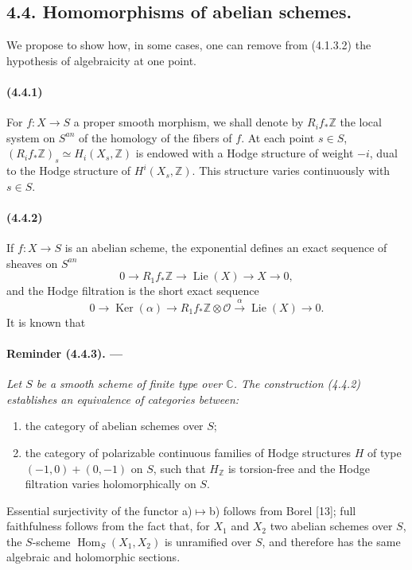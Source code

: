 \documentclass[10pt]{article}
\newcommand{\C}{\mathbb C}
\newcommand{\Z}{\mathbb Z}
\newcommand{\Ker}{\operatorname{Ker}}
\newcommand{\Hom}{\operatorname{Hom}}
\providecommand{\Lie}{\operatorname{Lie}}
\providecommand{\cO}{\mathcal O}
\providecommand{\cO}{\mathcal O}
\begin{document}
\subsection*{4.4. Homomorphisms of abelian schemes.}

We propose to show how, in some cases, one can remove from (4.1.3.2) the hypothesis of algebraicity at one point.

\paragraph{(4.4.1)} For $f:X\to S$ a proper smooth morphism, we shall denote by $R_if_*\Z$ the local system on $S^{an}$ of the homology of the fibers of $f$. At each point $s\in S$, $(R_if_*\Z)_s\simeq H_i(X_s,\Z)$ is endowed with a Hodge structure of weight $-i$, dual to the Hodge structure of $H^i(X_s,\Z)$. This structure varies continuously with $s\in S$.

\paragraph{(4.4.2)} If $f:X\to S$ is an abelian scheme, the exponential defines an exact sequence of sheaves on $S^{an}$
\[
0\to R_1f_*\Z\to\Lie(X)\to X\to0,
\]
and the Hodge filtration is the short exact sequence
\[
0\to\Ker(\alpha)\to R_1f_*\Z\otimes\cO\xrightarrow{\alpha}\Lie(X)\to0.
\]
It is known that

\paragraph{Reminder (4.4.3). ---} {\itshape Let $S$ be a smooth scheme of finite type over $\C$. The construction (4.4.2) establishes an equivalence of categories between:
\begin{enumerate}[label=\alph*)]
\item the category of abelian schemes over $S$;
\item the category of polarizable continuous families of Hodge structures $H$ of type $(-1,0)+(0,-1)$ on $S$, such that $H_\Z$ is torsion-free and the Hodge filtration varies holomorphically on $S$.
\end{enumerate}}
Essential surjectivity of the functor a)$\mapsto$b) follows from Borel [13]; full faithfulness follows from the fact that, for $X_1$ and $X_2$ two abelian schemes over $S$, the $S$-scheme $\Hom_S(X_1,X_2)$ is unramified over $S$, and therefore has the same algebraic and holomorphic sections.
\end{document}

